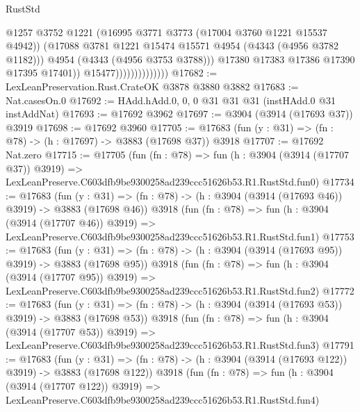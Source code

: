 \begin{lexlean}{RustStd}
\begin{coremodule}
                                      @1257
                                      @3752
                                      @1221
                                      (@16995 @3771 @3773 (@17004 @3760 @1221 @15537 @4942))
                                      (@17088
                                        @3781
                                        @1221
                                        @15474
                                        @15571
                                        @4954
                                        (@4343 (@4956 @3782 @1182)))
                                      @4954
                                      (@4343 (@4956 @3753 @3788)))
                                    @17380
                                    @17383
                                    @17386
                                    @17390
                                    @17395
                                    @17401))
                                @15477))))))))))))))
@17682 := LexLeanPreservation.Rust.CrateOK @3878 @3880 @3882
@17683 := Nat.casesOn.{0}
@17692 := HAdd.hAdd.{0, 0, 0} @31 @31 @31 (instHAdd.{0} @31 instAddNat)
@17693 := @17692 @3962
@17697 := @3904 (@3914 (@17693 @37)) @3919
@17698 := @17692 @3960
@17705 := @17683 (fun (y : @31) => (fn : @78) -> (h : @17697) -> @3883 (@17698 @37)) @3918
@17707 := @17692 Nat.zero
@17715 := @17705
    (fun (fn : @78) =>
    fun (h : @3904 (@3914 (@17707 @37)) @3919) =>
    LexLeanPreserve.C603dfb9be9300258ad239ccc51626b53.R1.RustStd.fun0)
@17734 := @17683
    (fun (y : @31) => (fn : @78) -> (h : @3904 (@3914 (@17693 @46)) @3919) -> @3883 (@17698 @46))
    @3918
    (fun (fn : @78) =>
    fun (h : @3904 (@3914 (@17707 @46)) @3919) =>
    LexLeanPreserve.C603dfb9be9300258ad239ccc51626b53.R1.RustStd.fun1)
@17753 := @17683
    (fun (y : @31) => (fn : @78) -> (h : @3904 (@3914 (@17693 @95)) @3919) -> @3883 (@17698 @95))
    @3918
    (fun (fn : @78) =>
    fun (h : @3904 (@3914 (@17707 @95)) @3919) =>
    LexLeanPreserve.C603dfb9be9300258ad239ccc51626b53.R1.RustStd.fun2)
@17772 := @17683
    (fun (y : @31) => (fn : @78) -> (h : @3904 (@3914 (@17693 @53)) @3919) -> @3883 (@17698 @53))
    @3918
    (fun (fn : @78) =>
    fun (h : @3904 (@3914 (@17707 @53)) @3919) =>
    LexLeanPreserve.C603dfb9be9300258ad239ccc51626b53.R1.RustStd.fun3)
@17791 := @17683
    (fun (y : @31) => (fn : @78) -> (h : @3904 (@3914 (@17693 @122)) @3919) -> @3883 (@17698 @122))
    @3918
    (fun (fn : @78) =>
    fun (h : @3904 (@3914 (@17707 @122)) @3919) =>
    LexLeanPreserve.C603dfb9be9300258ad239ccc51626b53.R1.RustStd.fun4)

\end{coremodule}
\end{lexlean}

